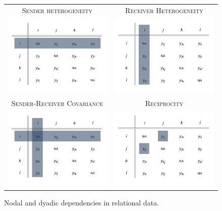 \begin{figure}
	\begin{tabular}{cc}
		\textsc{Sender heterogeneity} & \textsc{Receiver Heterogeneity} \\
		\includegraphics[width=.4\textwidth]{adjRowDep.png} & \includegraphics[width=.4\textwidth]{adjColDep.png} \\
		\textsc{Sender-Receiver Covariance} & \textsc{Reciprocity} \\
		\includegraphics[width=.4\textwidth]{adjRowColCovar.png} & \includegraphics[width=.4\textwidth]{adjRecip.png} \\
	\end{tabular}
	\caption{Nodal and dyadic dependencies in relational data.}
	\label{fig:adjMatDeps}
\end{figure}

